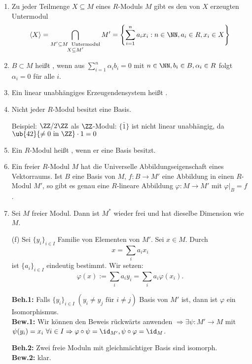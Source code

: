 \begin{Bem}
  \begin{enumerate}
    \item Zu jeder Teilmenge $X \subseteq M$ eines $R$-Moduls $M$ gibt es den von
          $X$ erzeugten Untermodul $$\langle X \rangle = \displaystyle 
          \bigcap_{\substack{M' \subseteq M\; \text{ Untermodul} \\ X \subseteq M'}} M' = \left\{
          \sum_{i=1}^n a_i x_i: n \in \NN, a_i \in R, x_i \in X \right\}$$
    \item $B \subset M$ heißt ,
          wenn aus $\displaystyle \sum_{i=1}^n \alpha_i b_i = 0$ mit $n \in
          \NN, b_i \in B, \alpha_i \in R$ folgt $\alpha_i = 0$ für alle
          $i$.
    \item Ein linear unabhängiges Erzeugendensystem heißt
          .
    \item Nicht jeder $R$-Modul besitzt eine Basis.

          Beispiel: $\ZZ/2\ZZ$ als $\ZZ$-Modul: $\{\bar{1}\}$
          ist nicht linear unabhängig, da $\ub{42}{\not= 0 \text{ in } \ZZ} \cdot 1 = 0$
    \item Ein $R$-Modul heißt , wenn er eine
          Basis besitzt.
    \item Ein freier $R$-Modul $M$ hat die Universelle Abbildungseigenschaft eines Vektorraums. Ist $B$ eine
          Basis von $M$, $f: B \to M'$ eine Abbildung in einen $R$-Modul $M'$, so
          gibt es genau eine $R$-lineare Abbildung $\varphi: M \to M'$ mit
          $\varphi|_B = f$.
    \item Sei $M$ freier Modul. Dann ist $M^*$ wieder frei und hat dieselbe
          Dimension wie $M$.
  \end{enumerate}
\end{Bem}

\begin{Bew}
\begin{enumerate}
\item[(f)] Sei $\{y_i\}_{i \in I}$ Familie von Elementen von $M'$.
Sei $x \in M$. Durch
\[
x=\sum_{i}a_ix_i
\]
ist $\{a_i\}_{i  \in I}$ eindeutig bestimmt. Wir setzen:
\[
\varphi(x):=\sum_i a_iy_i=\sum_ia_i\varphi(x_i).
\]

\textbf{Beh.1:} Falls $\{y_i\}_{i\in I}\;(y_i \neq y_j \text{ für } i\neq
j)$ Basis von $M'$ ist, dann ist $\varphi$ ein Isomorphismus.\\
\textbf{Bew.1:} Wir können den Beweis rückwärts anwenden
$\Rightarrow \exists \psi:
M' \rightarrow M$  mit $\psi(y_i)=x_i \ \forall i \in I \Rightarrow
\varphi \circ \psi = \id_{M'}, \psi \circ \varphi = \id_M$.

\textbf{Beh.2:} Zwei freie Moduln mit gleichmächtiger Basis sind isomorph.\\
\textbf{Bew.2:} klar.
\end{enumerate}
\end{Bew}

